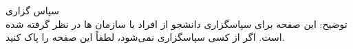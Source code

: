 

سپاس گزاری\\

توضیح: این صفحه برای سپاسگزاری دانشجو از افراد یا سازمان ها در نظر گرفته‌ شده است. اگر از کسی سپاسگزاری نمی‌شود، لطفاً این صفحه را پاک کنید.